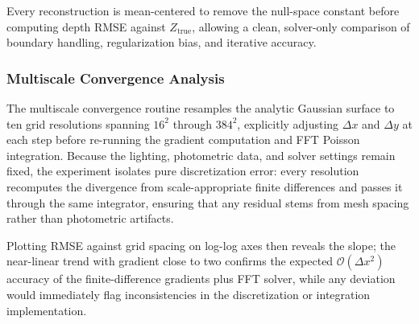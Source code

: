 \documentclass[11pt]{article}
\begin{document}
  Every reconstruction is mean-centered to remove the null-space constant before computing depth RMSE against $Z_{\text{true}}$, 
  allowing a clean, solver-only comparison of boundary
  handling, regularization bias, and iterative accuracy.


\subsubsection{Multiscale Convergence Analysis}



The multiscale convergence routine resamples the analytic Gaussian surface to ten grid resolutions spanning $16^2$ through $384^2$, 
explicitly adjusting $\Delta x$ and $\Delta y$ 
at each step before re-running the gradient computation and FFT Poisson integration. Because the lighting, photometric data,
and solver settings remain fixed, the experiment isolates pure discretization error: every resolution recomputes the divergence 
from scale-appropriate finite differences and passes it through the same
integrator, ensuring that any residual stems from mesh spacing rather than photometric artifacts. 

  \begin{center}
  \end{center}

Plotting RMSE against grid 
spacing on log-log axes then reveals the
slope; the near-linear trend with gradient close to two confirms the expected $\mathcal{O}(\Delta x^2)$ accuracy of the 
finite-difference gradients plus FFT solver, while any deviation would immediately flag
inconsistencies in the discretization or integration implementation.
  
\end{document}
